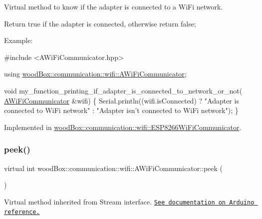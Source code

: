 Virtual method to know if the adapter is connected to a Wi\+Fi network.

Return true if the adapter is connected, otherwise return false;

Example\+:


\begin{DoxyCode}
\textcolor{preprocessor}{#include <AWiFiCommunicator.hpp>}

\textcolor{keyword}{using} \mbox{\hyperlink{classwood_box_1_1communication_1_1wifi_1_1_a_wi_fi_communicator}{woodBox::communication::wifi::AWiFiCommunicator}};

\textcolor{keywordtype}{void} my\_function\_printing\_if\_adapter\_is\_connected\_to\_network\_or\_not(
      \mbox{\hyperlink{classwood_box_1_1communication_1_1wifi_1_1_a_wi_fi_communicator_a9d1dc13ca9243170b04211bef2b86ed2}{AWiFiCommunicator}} &wifi) \{
  Serial.println((wifi.isConnected) ? \textcolor{stringliteral}{"Adapter is connected to WiFi network"} : \textcolor{stringliteral}{"Adapter isn't connected to
       WiFi network"});
\}
\end{DoxyCode}
 

Implemented in \mbox{\hyperlink{classwood_box_1_1communication_1_1wifi_1_1_e_s_p8266_wi_fi_communicator_a66b7f8adaae85dbf94062b1cd472d98a}{wood\+Box\+::communication\+::wifi\+::\+E\+S\+P8266\+Wi\+Fi\+Communicator}}.

\mbox{\label{classwood_box_1_1communication_1_1wifi_1_1_a_wi_fi_communicator_ae0a1f2f1906f76a12dd5f9b7c10b1282}} 
\subsubsection{\texorpdfstring{peek()}{peek()}}
{\footnotesize\ttfamily virtual int wood\+Box\+::communication\+::wifi\+::\+A\+Wi\+Fi\+Communicator\+::peek (\begin{DoxyParamCaption}{ }\end{DoxyParamCaption})\hspace{0.3cm}{\ttfamily [pure virtual]}}

Virtual method inherited from Stream interface. \href{https://www.arduino.cc/reference/en/language/functions/communication/stream/streampeek/}{\tt See documentation on Arduino reference.} 

